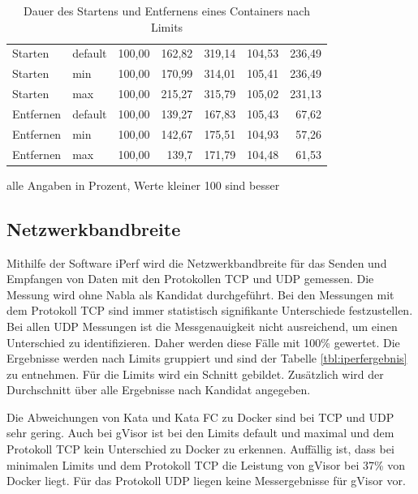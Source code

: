 \begin{table}[h]
	\small 
	\myfloatalign
	\begin{tabularx}{\textwidth}{Xlrrrrr} \hline
		\spacedlowsmallcaps{Messung} & \spacedlowsmallcaps{Limit} & \spacedlowsmallcaps{Docker} & \spacedlowsmallcaps{Kata} & \spacedlowsmallcaps{Kata FC} & \spacedlowsmallcaps{gVisor} & \spacedlowsmallcaps{Nabla} \\ \hline
		Starten   & default & 100,00    & 162,82 & 319,14  & 104,53 & 236,49 \\
		Starten   & min     & 100,00    & 170,99 & 314,01  & 105,41 & 236,49 \\
		Starten   & max     & 100,00    & 215,27 & 315,79  & 105,02 & 231,13 \\ \hline
		Entfernen & default & 100,00    & 139,27 & 167,83  & 105,43 & 67,62  \\
		Entfernen & min     & 100,00    & 142,67 & 175,51  & 104,93 & 57,26  \\
		Entfernen & max     & 100,00    & 139,7  & 171,79  & 104,48 & 61,53  \\ 
		\hline
	\end{tabularx}
	\caption[Dauer des Startens und Entfernens nach Limits]{Dauer des Startens und Entfernens eines Containers nach Limits}
	\footnotesize alle Angaben in Prozent, Werte kleiner 100 sind besser
	\label{tbl:timenachlimits}
\end{table}

\subsection{Netzwerkbandbreite}
Mithilfe der Software iPerf wird die Netzwerkbandbreite für das Senden und Empfangen von Daten mit den Protokollen \ac{TCP} und \ac{UDP} gemessen. Die Messung wird ohne Nabla als Kandidat durchgeführt. Bei den Messungen mit dem Protokoll \ac{TCP} sind immer statistisch signifikante Unterschiede festzustellen. Bei allen \ac{UDP} Messungen ist die Messgenauigkeit nicht ausreichend, um einen Unterschied zu identifizieren. Daher werden diese Fälle mit 100\% gewertet. Die Ergebnisse werden nach Limits gruppiert und sind der Tabelle \ref{tbl:iperfergebnis} zu entnehmen. Für die Limits wird ein Schnitt gebildet. Zusätzlich wird der Durchschnitt über alle Ergebnisse nach Kandidat angegeben.

Die Abweichungen von Kata und Kata FC zu Docker sind bei \ac{TCP} und \ac{UDP} sehr gering. Auch bei gVisor ist bei den Limits default und maximal und dem Protokoll \ac{TCP} kein Unterschied zu Docker zu erkennen. Auffällig ist, dass bei minimalen Limits und dem Protokoll \ac{TCP} die Leistung von gVisor bei 37\% von Docker liegt. Für das Protokoll \ac{UDP} liegen keine Messergebnisse für gVisor vor. 

